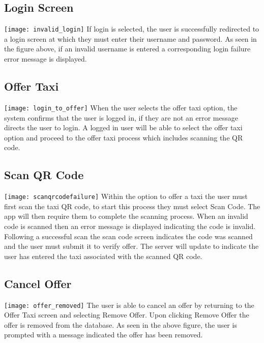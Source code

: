\documentclass[english]{article}
\begin{document}

\subsection{Login Screen}
\texttt{[image: invalid\_login]}
\newline
If login is selected, the user is successfully redirected to a login screen at which they must enter their username and password. As seen in the figure above, if an invalid username is entered a corresponding login failure error message is displayed. 


\subsection{Offer Taxi}
\texttt{[image: login\_to\_offer]}
\newline
When the user selects the offer taxi option, the system confirms that the user is logged in, if they are not an error message directs the user to login. A logged in user will be able to select the offer taxi option and proceed to the offer taxi process which includes scanning the QR code. 

\subsection{Scan QR Code}
\texttt{[image: scanqrcodefailure]}
\newline
Within the option to offer a taxi the user must first scan the taxi QR code, to start this process they must select Scan Code. The app will then require them to complete the scanning process. When an invalid code is scanned then an error message is displayed indicating the code is invalid. Following a successful scan the scan code screen indicates the code was scanned and the user must submit it to verify offer. The server will update to indicate the user has entered the taxi associated with the scanned QR code. 

\subsection{Cancel Offer}
\texttt{[image: offer\_removed]}
\newline
The user is able to cancel an offer by returning to the Offer Taxi screen and selecting Remove Offer. Upon clicking Remove Offer the offer is removed from the database. As seen in the above figure, the user is prompted with a message indicated the offer has been removed. 
\end{document}
